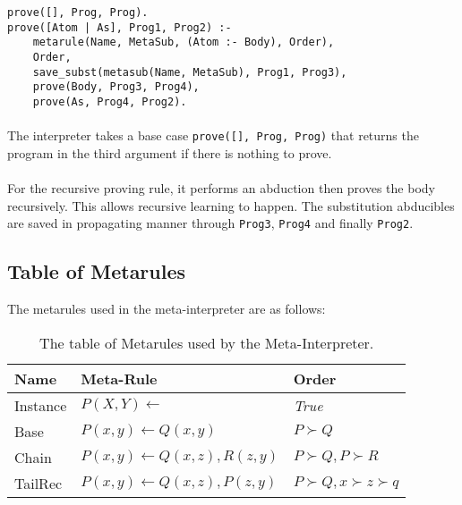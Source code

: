 \documentclass{article}
\theoremstyle{plain}
\theoremstyle{definition}
\begin{document}
\begin{multicols}{2}
\begin{lstlisting}
prove([], Prog, Prog).
prove([Atom | As], Prog1, Prog2) :-
	metarule(Name, MetaSub, (Atom :- Body), Order),
	Order,
	save_subst(metasub(Name, MetaSub), Prog1, Prog3),
	prove(Body, Prog3, Prog4),
	prove(As, Prog4, Prog2).
\end{lstlisting}

\paragraph{} The interpreter takes a base case \lstinline{prove([], Prog, Prog)} that returns the program in the third argument if there is nothing to prove.

\paragraph{} For the recursive proving rule, it performs an abduction then proves the body recursively. This allows recursive learning to happen. The substitution abducibles are saved in propagating manner through \lstinline{Prog3}, \lstinline{Prog4} and finally \lstinline{Prog2}.

\subsection{Table of Metarules}

The metarules used in the meta-interpreter are as follows:

\begin{table}[H]
\centering\footnotesize
\begin{tabular}{ | l | l | l | }
\hline
\textbf{Name} & \textbf{Meta-Rule} & \textbf{Order} \\
\hline
\hline

Instance & $P(X, Y) \leftarrow$ & \textit{True}\\
\hline

Base & $P(x, y) \leftarrow Q(x, y)$ & $P \succ Q$\\
\hline

Chain & $P(x, y) \leftarrow Q(x, z), R(z, y)$ & $P \succ Q, P \succ R$\\
\hline

TailRec & $P(x, y) \leftarrow Q(x, z), P(z, y)$ & $P \succ Q, x \succ z \succ q$\\
\hline
\end{tabular}
\caption{The table of Metarules used by the Meta-Interpreter.}\label{table:MILMetarules}
\end{table}


\end{multicols}
\end{document}

